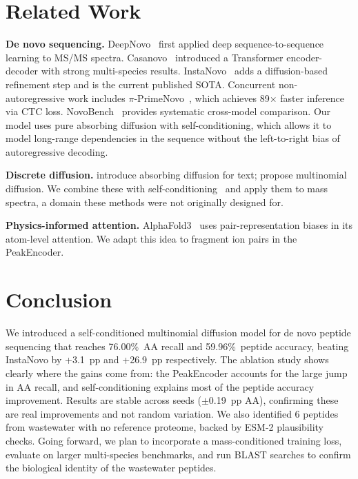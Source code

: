\documentclass[10pt,twocolumn]{article}
\begin{document}
\section{Related Work}

\textbf{De novo sequencing.}
DeepNovo~\citep{tran2017deepnovo} first applied deep sequence-to-sequence learning to MS/MS spectra.
Casanovo~\citep{casanovo2023} introduced a Transformer encoder-decoder with strong multi-species results.
InstaNovo~\citep{instanovo2024} adds a diffusion-based refinement step and is the current published SOTA.
Concurrent non-autoregressive work includes $\pi$-PrimeNovo~\citep{zhang2025primenovo}, which achieves
89$\times$ faster inference via CTC loss.
NovoBench~\citep{zhou2024novobench} provides systematic cross-model comparison.
Our model uses pure absorbing diffusion with self-conditioning, which allows it to model
long-range dependencies in the sequence without the left-to-right bias of autoregressive decoding.

\textbf{Discrete diffusion.}
\citet{austin2021structured} introduce absorbing diffusion for text; \citet{hoogeboom2021argmax}
propose multinomial diffusion. We combine these with self-conditioning~\citep{chen2022analog}
and apply them to mass spectra, a domain these methods were not originally designed for.

\textbf{Physics-informed attention.}
AlphaFold3~\citep{abramson2024alphafold3} uses pair-representation biases in its atom-level
attention. We adapt this idea to fragment ion pairs in the PeakEncoder.

\section{Conclusion}

We introduced a self-conditioned multinomial diffusion model for de novo peptide sequencing that
reaches 76.00\%~AA recall and 59.96\%~peptide accuracy, beating InstaNovo by +3.1~pp and
+26.9~pp respectively.
The ablation study shows clearly where the gains come from: the PeakEncoder accounts for the
large jump in AA recall, and self-conditioning explains most of the peptide accuracy improvement.
Results are stable across seeds ($\pm$0.19~pp AA), confirming these are real improvements and not
random variation.
We also identified 6 peptides from wastewater with no reference proteome, backed by ESM-2
plausibility checks.
Going forward, we plan to incorporate a mass-conditioned training loss, evaluate on larger
multi-species benchmarks, and run BLAST searches to confirm the biological identity of the
wastewater peptides.
\end{document}

